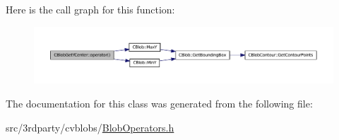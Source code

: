 Here is the call graph for this function:
\nopagebreak
\begin{figure}[H]
\begin{center}
\leavevmode
\includegraphics[width=400pt]{class_c_blob_get_y_center_a5cdb219c957adc1bf08c95e7823e407b_cgraph}
\end{center}
\end{figure}




The documentation for this class was generated from the following file:\begin{DoxyCompactItemize}
\item 
src/3rdparty/cvblobs/\hyperlink{_blob_operators_8h}{BlobOperators.h}\end{DoxyCompactItemize}
